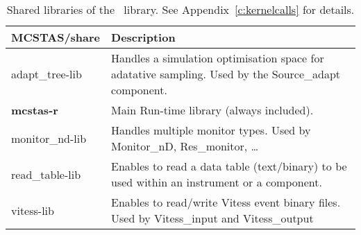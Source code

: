 \begin{table}
  \begin{center}
    {\let\my=\\
    \begin{tabular}{|p{}|p{}|}
      \hline
       MCSTAS/share & Description \\ 
       \hline
       adapt\_tree-lib  & Handles a simulation optimisation space for adatative sampling.
                          Used by the Source\_adapt component. \\
       {\bf mcstas-r}      &   Main Run-time library (always included). \\
       monitor\_nd-lib & Handles multiple monitor types. 
                        Used by Monitor\_nD, Res\_monitor, \ldots \\
       read\_table-lib  & Enables to read a data table (text/binary) to be used within
                          an instrument or a component. \\
       vitess-lib &     Enables to read/write Vitess event binary files. 
                        Used by Vitess\_input and Vitess\_output \\             
      \hline
    \end{tabular}
    \caption{Shared libraries of the \MCS\ library. See Appendix~\ref{c:kernelcalls} for details.}
    \label{t:comp-share}
    }
  \end{center}
\end{table}
